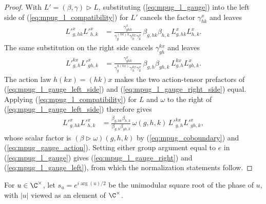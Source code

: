 \begin{proof}\leanok
    With $L'=(\beta,\gamma)\mathbin{\triangleright}L$, substituting
    (\ref{eq:mpug_l_gauge}) into the left side of
    (\ref{eq:mpug_l_compatibility}) for $L'$ cancels the factor
    $\gamma^x_{hk}$ and leaves
    \begin{align}
        {L'}^x_{g,hk}{L'}^x_{h,k}
         & =\frac{\gamma^x_{ghk}}
        {\gamma^{(hk)x}_g\gamma^{k x}_h\gamma^x_k}\,
        \beta_{g,hk}\beta_{h,k}\,L^x_{g,hk}L^x_{h,k}.
        \label{eq:mpug_l_gauge_left_side}
    \end{align}
    The same substitution on the right side cancels
    $\gamma^{k x}_{gh}$ and leaves
    \begin{align}
        {L'}^{k x}_{g,h}{L'}^x_{gh,k}
         & =\frac{\gamma^x_{ghk}}
        {\gamma^{h(k x)}_g\gamma^{k x}_h\gamma^x_k}\,
        \beta_{g,h}\beta_{gh,k}\,L^{k x}_{g,h}L^x_{gh,k}.
        \label{eq:mpug_l_gauge_right_side}
    \end{align}
    The action law $h(k x)=(hk)x$ makes the two action-tensor prefactors of
    (\ref{eq:mpug_l_gauge_left_side}) and
    (\ref{eq:mpug_l_gauge_right_side}) equal. Applying
    (\ref{eq:mpug_l_compatibility}) for $L$ and $\omega$ to the right of
    (\ref{eq:mpug_l_gauge_left_side}) therefore gives
    \begin{align}
        {L'}^x_{g,hk}{L'}^x_{h,k}
         & =\frac{\beta_{g,hk}\beta_{h,k}}
        {\beta_{g,h}\beta_{gh,k}}\,\omega(g,h,k)\,
        {L'}^{k x}_{g,h}{L'}^x_{gh,k},
        \label{eq:mpug_l_gauge_compatibility}
    \end{align}
    whose scalar factor is
    $(\beta\mathbin{\triangleright}\omega)(g,h,k)$ by
    (\ref{eq:mpug_coboundary}) and
    (\ref{eq:mpug_gauge_action}). Setting either group argument equal
    to $e$ in (\ref{eq:mpug_l_gauge}) gives
    (\ref{eq:mpug_l_gauge_right}) and
    (\ref{eq:mpug_l_gauge_left}), from which the normalization statements
    follow.
\end{proof}

\begin{definition}
    \label{def:mpug_phase_root}
    \leanok
    For $u\in\C^\times$, let $s_u=e^{i\arg(u)/2}$ be the unimodular square root
    of the phase of $u$, with $|u|$ viewed as an element of $\C^\times$.
\end{definition}

